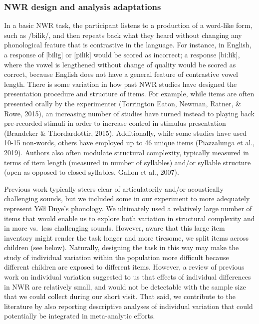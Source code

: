 \documentclass[english,,man,floatsintext]{apa6}
\begin{document}
\hypertarget{nwr-design-and-analysis-adaptations}{%
\subsubsection{NWR design and analysis adaptations}\label{nwr-design-and-analysis-adaptations}}

In a basic NWR task, the participant listens to a production of a word-like form, such as /bilik/, and then repeats back what they heard without changing any phonological feature that is contrastive in the language. For instance, in English, a response of {[}bilig{]} or {[}pilik{]} would be scored as incorrect; a response {[}biːlik{]}, where the vowel is lengthened without change of quality would be scored as correct, because English does not have a general feature of contrastive vowel length. There is some variation in how past NWR studies have designed the presentation procedure and structure of items. For example, while items are often presented orally by the experimenter (Torrington Eaton, Newman, Ratner, \& Rowe, 2015), an increasing number of studies have turned instead to playing back pre-recorded stimuli in order to increase control in stimulus presentation (Brandeker \& Thordardottir, 2015). Additionally, while some studies have used 10-15 non-words, others have employed up to 46 unique items (Piazzalunga et al., 2019). Authors also often modulate structural complexity, typically measured in terms of item length (measured in number of syllables) and/or syllable structure (open as opposed to closed syllables, Gallon et al., 2007).

Previous work typically steers clear of articulatorily and/or acoustically challenging sounds, but we included some in our experiment to more adequately represent Yélî Dnye's phonology. We ultimately used a relatively large number of items that would enable us to explore both variation in structural complexity and in more vs.~less challenging sounds. However, aware that this large item inventory might render the task longer and more tiresome, we split items across children (see below). Naturally, designing the task in this way may make the study of individual variation within the population more difficult because different children are exposed to different items. However, a review of previous work on individual variation suggested to us that effects of individual differences in NWR are relatively small, and would not be detectable with the sample size that we could collect during our short visit. That said, we contribute to the literature by also reporting descriptive analyses of individual variation that could potentially be integrated in meta-analytic efforts.
\end{document}
